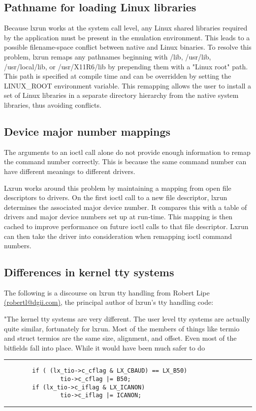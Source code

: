 \documentclass[letterpaper]{article}
\begin{document}
\subsection{Pathname for loading Linux libraries }

Because lxrun works at the system call level, any Linux shared
libraries required by the application must be present in the
emulation environment.  This leads to a possible filename-space
conflict between native and Linux binaries.  To resolve this
problem, lxrun remaps any pathnames beginning with /lib,
/usr/lib, /usr/local/lib, or /usr/X11R6/lib by prepending them
with a "Linux root" path.  This path is specified at compile
time and can be overridden by setting the LINUX\_ROOT environment
variable. This remapping allows the user to install a set of
Linux libraries in a separate directory hierarchy from the
native system libraries, thus avoiding conflicts.




\subsection{Device major number mappings}

The arguments to an ioctl call alone do not provide enough
information to remap the command number correctly.  This is
because the same command number can have different meanings to
different drivers.

Lxrun works around this problem by maintaining a mapping from
open file descriptors to drivers.  On the first ioctl call to a
new file descriptor, lxrun determines the associated major
device number.  It compares this with a table of drivers and
major device numbers set up at run-time.  This mapping is then
cached to improve performance on future ioctl calls to that file
descriptor.  Lxrun can then take the driver into consideration
when remapping ioctl command numbers.




\subsection{Differences in kernel tty systems}

The following is a discourse on lxrun tty handling from Robert Lipe
\url{(robertl@dgii.com)}, the
principal author of lxrun's tty handling code:

"The kernel tty systems are very different. The user level tty systems
are actually quite similar, fortunately for lxrun. Most of the members
of things like termio and struct termios are the same size, alignment, 
and offset. Even most of the bitfields fall into place. While
it would have been much safer to do
\par
\addvspace{\medskipamount}
\nopagebreak\hrule
\begin{verbatim}
        if ( (lx_tio->c_cflag & LX_CBAUD) == LX_B50)
                tio->c_cflag |= B50;
        if (lx_tio->c_iflag & LX_ICANON) 
                tio->c_iflag |= ICANON;
\end{verbatim} 
\nopagebreak\hrule 
\addvspace{\medskipamount}
\end{document}
